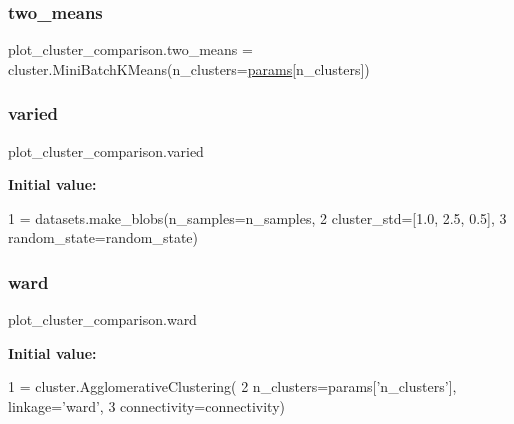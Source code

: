 \subsubsection{\texorpdfstring{two\+\_\+means}{two\_means}}
{\footnotesize\ttfamily plot\+\_\+cluster\+\_\+comparison.\+two\+\_\+means = cluster.\+Mini\+Batch\+K\+Means(n\+\_\+clusters=\hyperlink{namespaceplot__cluster__comparison_a5afe27ff875351ace28865d50f61c56a}{params}\mbox{[}\textquotesingle{}n\+\_\+clusters\textquotesingle{}\mbox{]})}

\mbox{\label{namespaceplot__cluster__comparison_a25773486b8df3fde9e17bca039afecb1}} 
\subsubsection{\texorpdfstring{varied}{varied}}
{\footnotesize\ttfamily plot\+\_\+cluster\+\_\+comparison.\+varied}

{\bfseries Initial value\+:}
\begin{DoxyCode}
1 =  datasets.make\_blobs(n\_samples=n\_samples,
2                              cluster\_std=[1.0, 2.5, 0.5],
3                              random\_state=random\_state)
\end{DoxyCode}
\mbox{\label{namespaceplot__cluster__comparison_a8c73d7edecd47d7b3a32447d9c8a9f32}} 
\subsubsection{\texorpdfstring{ward}{ward}}
{\footnotesize\ttfamily plot\+\_\+cluster\+\_\+comparison.\+ward}

{\bfseries Initial value\+:}
\begin{DoxyCode}
1 =  cluster.AgglomerativeClustering(
2         n\_clusters=params[\textcolor{stringliteral}{'n\_clusters'}], linkage=\textcolor{stringliteral}{'ward'},
3         connectivity=connectivity)
\end{DoxyCode}
\mbox{\label{namespaceplot__cluster__comparison_af7c99d4267ffefc921a644fe6ef64c3b}} 
